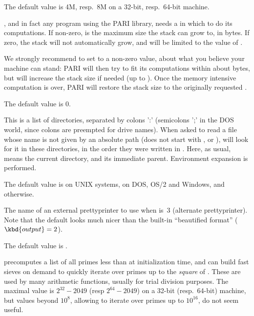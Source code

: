 {The default value is 4M, resp.~8M on a 32-bit, resp.~64-bit machine.

\label{se:def,parisizemax}
, and in fact any program using the PARI library, needs a
 in which to do its computations.  If non-zero,  
is the maximum size the stack can grow to, in bytes.  If zero, the stack will
not automatically grow, and will be limited to the value of .

We strongly recommend to set  to a non-zero value, about
what you believe your machine can stand: PARI will then try to fit its
computations within about  bytes, but will increase the stack
size if needed (up to ). Once the memory intensive
computation is over, PARI will restore the stack size to the originally
requested .

The default value is $0$.

\label{se:def,path}
This is a list of directories, separated by colons ':'
(semicolons ';' in the DOS world, since colons are preempted for drive names).
When asked to read a file whose name is not given by an absolute path
(does not start with \kbd{/},  or ),  will look for
it in these directories, in the order they were written in . Here,
as usual,  means the current directory, and  its immediate
parent. Environment expansion is performed.

The default value is  on UNIX systems,
 on DOS, OS/2 and Windows, and  otherwise.

\label{se:def,prettyprinter}
The name of an external prettyprinter to use when
 is~3 (alternate prettyprinter). Note that the default
 looks much nicer than the built-in ``beautified
format'' ($\kbd{output} = 2$).

The default value is .

\label{se:def,primelimit}
 precomputes a list of
all primes less than  at initialization time, and can build
fast sieves on demand to quickly iterate over primes up to the \emph{square}
of . These are used by many arithmetic functions, usually for
trial division purposes. The maximal value is $2^{32} - 2049$ (resp $2^{64} -
2049$) on a 32-bit (resp.~64-bit) machine, but values beyond $10^8$,
allowing to iterate over primes up to $10^{16}$, do not seem useful.

}
